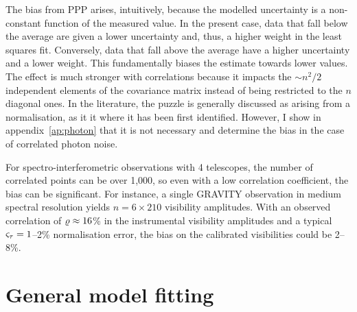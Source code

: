 \documentclass{pasa}
\begin{document}
The bias from PPP arises, intuitively, because the modelled uncertainty is a non-constant function of the measured value. In the present case, data that fall below the average are given a lower uncertainty and, thus, a higher weight in the least squares fit. Conversely, data that fall above the average have a higher uncertainty and a lower weight. This fundamentally biases the estimate towards lower values.  The effect is much stronger with correlations because it impacts the $\sim n^2/2$ independent elements of the covariance matrix instead of being restricted to the $n$ diagonal ones.  In the literature, the puzzle is generally discussed as arising from a normalisation, as it it where it has been first identified. However, I show in appendix~\ref{ap:photon} that it is not necessary and determine the bias in the case of correlated photon noise.

For spectro-interferometric observations with 4 telescopes, the number of correlated points can be over 1,000, so even with a low correlation coefficient, the bias can be significant. For instance, a single GRAVITY observation in medium spectral resolution yields $n = 6 \times 210$ visibility amplitudes. With an observed correlation of $\varrho \approx 16$\% in the instrumental visibility amplitudes \citep{KAM20} and a typical $\varsigma_\tau = 1$--2\% normalisation error, the bias on the calibrated visibilities could be 2--8\%.  

\section{General model fitting}
\label{sec:model}
\end{document}
